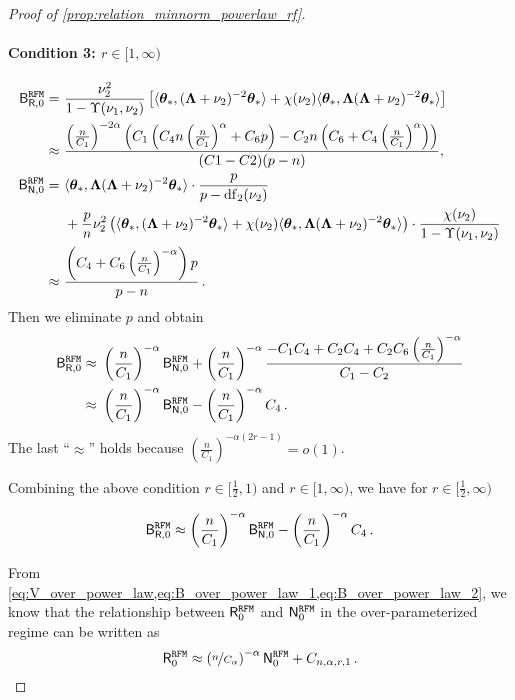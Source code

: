 \begin{proof}[Proof of \cref{prop:relation_minnorm_powerlaw_rf}]
\paragraph{Condition 3: $r \in [1, \infty)$}
\[
\begin{aligned}
\mathsf B_{\mathsf R,0}^{\tt RFM} =&~ \frac{\nu_2^2}{1 - \Upsilon(\nu_1, \nu_2)} \left[ \langle {\boldsymbol \theta}_*, ({\boldsymbol \Lambda} + \nu_2)^{-2} {\boldsymbol \theta}_* \rangle + \chi(\nu_2) \langle {\boldsymbol \theta}_*, {\boldsymbol \Lambda} ({\boldsymbol \Lambda} + \nu_2)^{-2} {\boldsymbol \theta}_* \rangle \right]\\
\approx&~\frac{\left(\frac{n}{C_1}\right)^{-2\alpha}\left(C_1\left(C_4 n \left(\frac{n}{C_1}\right)^{\alpha} + C_6 p\right) - C_2 n \left(C_6 + C_4 \left(\frac{n}{C_1}\right)^{\alpha}\right)\right)}{(C1-C2)(p-n)},\\
\mathsf B_{\mathsf N,0}^{\tt RFM} =&~ \langle {\boldsymbol \theta}_*, {\boldsymbol \Lambda} ( {\boldsymbol \Lambda} + \nu_2)^{-2} {\boldsymbol \theta}_* \rangle \cdot \frac{p}{p - {\rm df}_2(\nu_2)}\\
&~+ \frac{p}{n} \nu_2^2 \left( \langle {\boldsymbol \theta}_*, ({\boldsymbol \Lambda} + \nu_2)^{-2} {\boldsymbol \theta}_* \rangle + \chi(\nu_2) \langle {\boldsymbol \theta}_*, {\boldsymbol \Lambda} ({\boldsymbol \Lambda} + \nu_2)^{-2} {\boldsymbol \theta}_* \rangle \right) \cdot \frac{\chi(\nu_2)}{1 - \Upsilon(\nu_1, \nu_2)}\\
\approx&~ \frac{\left(C_4+C_6\left(\frac{n}{C_1}\right)^{-\alpha}\right)p}{p-n}\,.
\end{aligned}
\]
Then we eliminate $p$ and obtain
\[
\begin{aligned}
\mathsf B_{\mathsf R,0}^{\tt RFM} \approx&~ \left(\frac{n}{C_1}\right)^{-\alpha} \mathsf B_{\mathsf N,0}^{\tt RFM} + \left(\frac{n}{C_1}\right)^{-\alpha}\frac{-C_1C_4+C_2C_4+C_2C_6\left(\frac{n}{C_1}\right)^{-\alpha}}{C_1-C_2}\\
\approx&~ \left(\frac{n}{C_1}\right)^{-\alpha} \mathsf B_{\mathsf N,0}^{\tt RFM} - \left(\frac{n}{C_1}\right)^{-\alpha}C_4\,.
\end{aligned}
\]
The last ``$\approx$'' holds because $\left(\frac{n}{C_1}\right)^{-\alpha(2r-1)} = o(1)$.

Combining the above condition \(r \in [\frac{1}{2}, 1)\) and \(r \in [1, \infty)\), we have for \(r \in [\frac{1}{2}, \infty)\)

\begin{equation}\label{eq:B_over_power_law_2}
\mathsf B_{\mathsf R,0}^{\tt RFM} \approx \left(\frac{n}{C_1}\right)^{-\alpha} \mathsf B_{\mathsf N,0}^{\tt RFM} - \left(\frac{n}{C_1}\right)^{-\alpha}C_4\,.    
\end{equation}

From \cref{eq:V_over_power_law,eq:B_over_power_law_1,eq:B_over_power_law_2}, we know that the relationship between \(\mathsf R_0^{\tt RFM}\) and \(\mathsf N_0^{\tt RFM}\) in the over-parameterized regime can be written as
\[
\mathsf R_0^{\tt RFM} \approx \left(\nicefrac{n}{C_\alpha}\right)^{-\alpha} \mathsf N_0^{\tt RFM} + C_{n,\alpha,r,1}\,.
\]



\end{proof}
